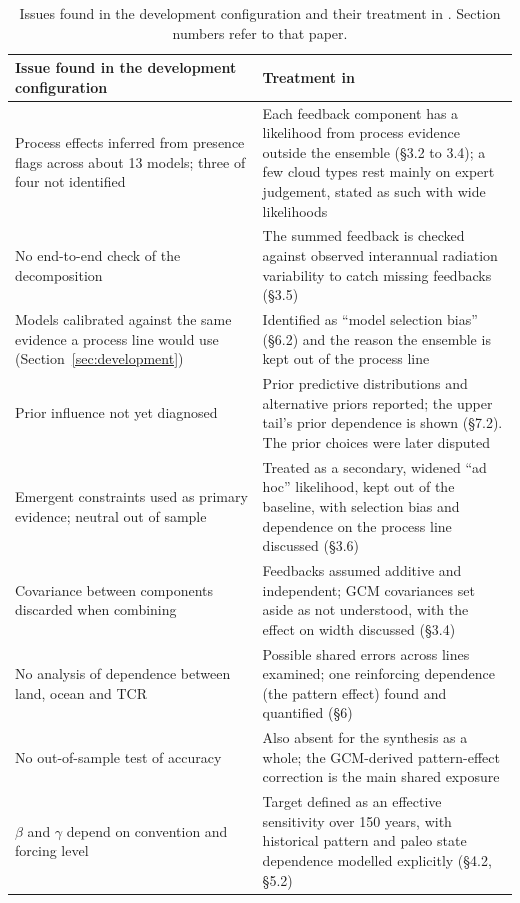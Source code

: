 \documentclass[11pt,a4paper]{article}
\begin{document}
\begin{table}[ht]
\centering\small
\caption{Issues found in the development configuration and their treatment in \citet{sherwood2020}. Section numbers refer to that paper.}
\label{tab:sherwood}
\begin{tabularx}{\textwidth}{>{\raggedright\arraybackslash}p{}L}
\toprule
Issue found in the development configuration & Treatment in \citet{sherwood2020} \\
\midrule
Process effects inferred from presence flags across about 13 models; three of four not identified & Each feedback component has a likelihood from process evidence outside the ensemble (\S3.2 to 3.4); a few cloud types rest mainly on expert judgement, stated as such with wide likelihoods \\
No end-to-end check of the decomposition & The summed feedback is checked against observed interannual radiation variability to catch missing feedbacks (\S3.5) \\
Models calibrated against the same evidence a process line would use (Section~\ref{sec:development}) & Identified as ``model selection bias'' (\S6.2) and the reason the ensemble is kept out of the process line \\
Prior influence not yet diagnosed & Prior predictive distributions and alternative priors reported; the upper tail's prior dependence is shown (\S7.2). The prior choices were later disputed \citep{lewis2022} \\
Emergent constraints used as primary evidence; neutral out of sample & Treated as a secondary, widened ``ad hoc'' likelihood, kept out of the baseline, with selection bias and dependence on the process line discussed (\S3.6) \\
Covariance between components discarded when combining & Feedbacks assumed additive and independent; GCM covariances set aside as not understood, with the effect on width discussed (\S3.4) \\
No analysis of dependence between land, ocean and TCR & Possible shared errors across lines examined; one reinforcing dependence (the pattern effect) found and quantified (\S6) \\
No out-of-sample test of accuracy & Also absent for the synthesis as a whole; the GCM-derived pattern-effect correction is the main shared exposure \\
$\beta$ and $\gamma$ depend on convention and forcing level & Target defined as an effective sensitivity over 150 years, with historical pattern and paleo state dependence modelled explicitly (\S4.2, \S5.2) \\
\bottomrule
\end{tabularx}
\end{table}
\end{document}
